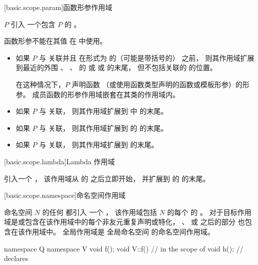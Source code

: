 [basic.scope.param]{函数形参作用域}

%
%

\pnum
{} $P$ 引入
一个包含 $P$ 的 。
\begin{note}
函数形参不能在其值
在  中使用。
\end{note}
\begin{itemize}
\item
如果 $P$ 与  关联并且
在形式为
  的（可能是带括号的） 之前，
则其作用域扩展到最近的外围
、
、
 的  或
 或
 的末尾，
但不包括关联的  的位置。
\begin{note}
在这种情况下，$P$ 声明函数
（或使用函数类型声明的函数或模板形参）的形参。
成员函数的形参作用域嵌套在其类的作用域内。
\end{note}
\item
如果 $P$ 与  关联，
则其作用域扩展到  中  的末尾。
\item
如果 $P$ 与  关联，
则其作用域扩展到  的  的末尾。
\item
如果 $P$ 与  关联，
则其作用域扩展到  的末尾。
\end{itemize}

[basic.scope.lambda]{Lambda 作用域}

  引入一个 ，
该作用域从  的  之后立即开始，
并扩展到  的  的末尾。

[basic.scope.namespace]{命名空间作用域}

\pnum
命名空间 $N$ 的任何  都引入
一个 ，
该作用域包括 $N$ 的每个  的 。
对于目标作用域是或包含在该作用域中的每个非友元重复声明或特化，
、
 或
 之后的部分
也包含在该作用域中。
全局作用域是
全局命名空间 的命名空间作用域。
\begin{example}
\begin{codeblock}
namespace Q {
  namespace V { void f(); }
  void V::f() {         // in the scope of 
    void h();           // declares 
  }
}
\end{codeblock}
\end{example}

